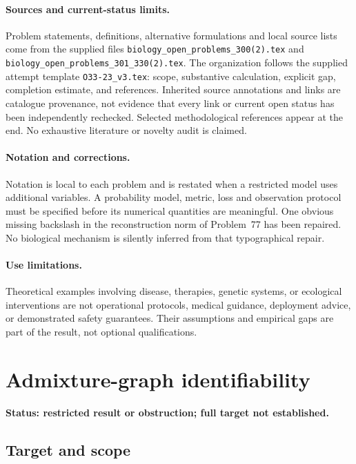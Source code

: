 \documentclass[11pt]{article}
\begin{document}
\paragraph{Sources and current-status limits.}
Problem statements, definitions, alternative formulations and local source lists
come from the supplied files
\texttt{biology\_open\_problems\_300(2).tex} and
\texttt{biology\_open\_problems\_301\_330(2).tex}.
The organization follows the supplied attempt template
\texttt{O33-23\_v3.tex}: scope, substantive calculation, explicit gap,
completion estimate, and references. Inherited source annotations and links are
catalogue provenance, not evidence that every link or current open status has
been independently rechecked. Selected methodological references appear at the
end. No exhaustive literature or novelty audit is claimed.

\paragraph{Notation and corrections.}
Notation is local to each problem and is restated when a restricted model uses
additional variables. A probability model, metric, loss and observation protocol
must be specified before its numerical quantities are meaningful. One obvious
missing backslash in the reconstruction norm of Problem~77 has been repaired.
No biological mechanism is silently inferred from that typographical repair.

\paragraph{Use limitations.}
Theoretical examples involving disease, therapies, genetic systems, or ecological
interventions are not operational protocols, medical guidance, deployment advice,
or demonstrated safety guarantees. Their assumptions and empirical gaps are part
of the result, not optional qualifications.


\section*{Admixture-graph identifiability}
\label{prob:179}
\noindent\textbf{Status: restricted result or obstruction; full target not established.}
\subsection{Target and scope}
\end{document}
